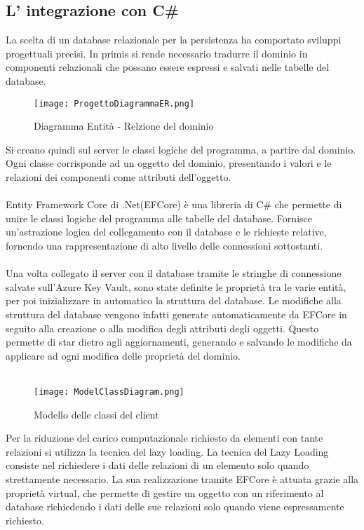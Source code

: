 \clearpage




\clearpage




\subsection{L' integrazione con C\#}

La scelta di un database relazionale per la persistenza ha comportato sviluppi progettuali precisi. 
In primis si rende necessario tradurre il dominio in componenti relazionali che possano essere espressi e salvati nelle tabelle del database.

\begin{figure}[h!]
    \centering
    \texttt{[image: ProgettoDiagrammaER.png]}
    \caption{Diagramma Entità - Relzione del dominio}
\end{figure}	

Si creano quindi sul server le classi logiche del programma, a partire dal dominio. 
Ogni classe corrisponde ad un oggetto del dominio, presentando i valori e le relazioni dei componenti come attributi dell’oggetto.\\
\\
Entity Framework Core di .Net(EFCore) è una libreria di C\# che permette di unire le classi logiche del programma alle tabelle del database. 
Fornisce un’astrazione logica del collegamento con il database e le richieste relative, fornendo una rappresentazione di alto livello delle connessioni sottostanti. \\
\\
Una volta collegato il server con il database tramite le stringhe di connessione salvate sull’Azure Key Vault, 
sono state definite le proprietà tra le varie entità, per poi inizializzare in automatico la struttura del database. 
Le modifiche alla struttura del database vengono infatti generate automaticamente da EFCore in seguito alla creazione o alla modifica degli attributi degli oggetti. 
Questo permette di star dietro agli aggiornamenti, generando e salvando le modifiche da applicare ad ogni modifica delle proprietà del dominio.\\
\\
\begin{figure}[h!]
    \begin{center}
        \texttt{[image: ModelClassDiagram.png]}
        \caption{Modello delle classi del client}
    \end{center}
\end{figure}

Per la riduzione del carico computazionale richiesto da elementi con tante relazioni si utilizza la tecnica del lazy loading. 
La tecnica del Lazy Loading consiste nel richiedere i dati delle relazioni di un elemento solo quando strettamente necessario. 
La sua realizzazione tramite EFCore è attuata grazie alla proprietà virtual, 
che permette di gestire un oggetto con un riferimento al database richiedendo i dati delle sue relazioni solo quando viene espressamente richiesto.
\clearpage